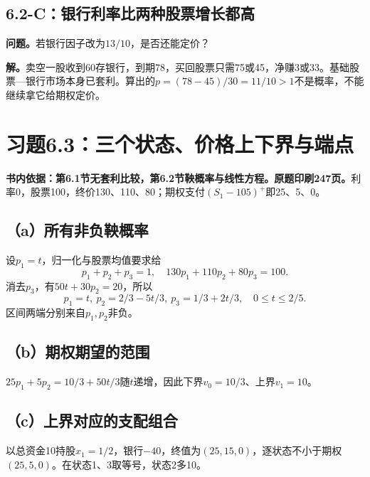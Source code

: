 \documentclass[11pt,a4paper,UTF8,fontset=fandol]{ctexart}
\begin{document}
\subsection{6.2-C：银行利率比两种股票增长都高}\label{cux94f6ux884cux5229ux7387ux6bd4ux4e24ux79cdux80a1ux7968ux589eux957fux90fdux9ad8}

\textbf{问题。}若银行因子改为\(13/10\)，是否还能定价？

\textbf{解。}卖空一股收到60存银行，到期78，买回股票只需75或45，净赚3或33。基础股票---银行市场本身已套利。算出的\(p=(78-45)/30=11/10>1\)不是概率，不能继续拿它给期权定价。

\bigskip

\section{习题6.3：三个状态、价格上下界与端点}\label{ux4e60ux98986.3ux4e09ux4e2aux72b6ux6001ux4ef7ux683cux4e0aux4e0bux754cux4e0eux7aefux70b9}

\textbf{书内依据：第6.1节无套利比较，第6.2节鞅概率与线性方程。原题印刷247页。}利率0，股票100，终价130、110、80；期权支付\((S_1-105)^+\)即25、5、0。

\subsection{（a）所有非负鞅概率}\label{aux6240ux6709ux975eux8d1fux9785ux6982ux7387}

设\(p_1=t\)，归一化与股票均值要求给
\[p_1+p_2+p_3=1,\quad130p_1+110p_2+80p_3=100.\]
消去\(p_3\)，有\(50t+30p_2=20\)，所以
\[\boxed{p_1=t,\ p_2=2/3-5t/3,\ p_3=1/3+2t/3,\quad0\le t\le2/5.}\]
区间两端分别来自\(p_1,p_2\)非负。

\subsection{（b）期权期望的范围}\label{bux671fux6743ux671fux671bux7684ux8303ux56f4}

\(25p_1+5p_2=10/3+50t/3\)随\(t\)递增，因此下界\(v_0=10/3\)、上界\(v_1=10\)。

\subsection{（c）上界对应的支配组合}\label{cux4e0aux754cux5bf9ux5e94ux7684ux652fux914dux7ec4ux5408}

以总资金10持股\(\boxed{x_1=1/2}\)，银行\(-40\)，终值为\((25,15,0)\)，逐状态不小于期权\((25,5,0)\)。在状态1、3取等号，状态2多10。
\end{document}

